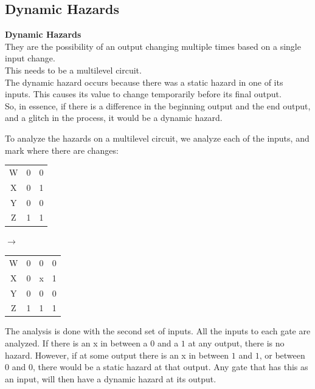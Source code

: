 \documentclass[nobib]{tufte-handout}
\begin{document}
    \subsection{Dynamic Hazards}
    \begin{mdframed}
        \textbf{Dynamic Hazards}\\
        They are the possibility of an output changing multiple times based on a single input change.\\
        This needs to be a multilevel circuit.\\
        The dynamic hazard occurs because there was a static hazard in one of its inputs. This causes its value to change temporarily before its final output.\\
        So, in essence, if there is a difference in the beginning output and the end output, and a glitch in the process, it would be a dynamic hazard.
    \end{mdframed}
    To analyze the hazards on a multilevel circuit, we analyze each of the inputs, and mark where there are changes:
    \begin{table}
        \centering
        \begin{tabular}{|c|c c|}
            W & 0 & 0 \\
            X & 0 & 1 \\
            Y & 0 & 0 \\
            Z & 1 & 1 \\
        \end{tabular} $\rightarrow$
        \begin{tabular}{|c|c c c|}
            W & 0 & 0 & 0 \\
            X & 0 & x & 1 \\
            Y & 0 & 0 & 0 \\
            Z & 1 & 1 & 1 \\
        \end{tabular}
    \end{table}
    The analysis is done with the second set of inputs. All the inputs to each gate are analyzed. If there is an x in between a $0$ and a $1$ at any output, there is no hazard. However, if at some output there is an x in between $1$ and $1$, or between $0$ and $0$, there would be a static hazard at that output. Any gate that has this as an input, will then have a dynamic hazard at its output.
\end{document}

